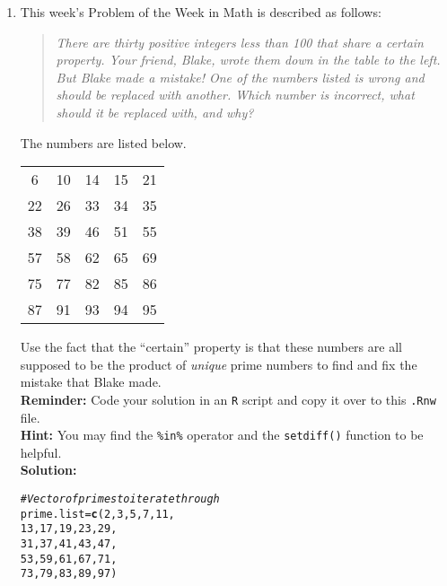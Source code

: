 \documentclass{article}\usepackage[]{graphicx}\usepackage[]{xcolor}
\makeatletter
\newcommand{\hlnum}[1]{\textcolor[rgb]{0.686,0.059,0.569}{#1}}%
\newcommand{\hlcom}[1]{\textcolor[rgb]{0.678,0.584,0.686}{\textit{#1}}}%
\newcommand{\hldef}[1]{\textcolor[rgb]{0.345,0.345,0.345}{#1}}%
\newcommand{\hlkwb}[1]{\textcolor[rgb]{0.69,0.353,0.396}{#1}}%
\newcommand{\hlkwd}[1]{\textcolor[rgb]{0.737,0.353,0.396}{\textbf{#1}}}%
\newenvironment{kframe}{%
 \def\at@end@of@kframe{}%
 \ifinner\ifhmode%
  \def\at@end@of@kframe{\end{minipage}}%
  \begin{minipage}{\columnwidth}%
 \fi\fi%
 \def\FrameCommand##1{\hskip\@totalleftmargin \hskip-\fboxsep
 \colorbox{shadecolor}{##1}\hskip-\fboxsep
     \hskip-\linewidth \hskip-\@totalleftmargin \hskip\columnwidth}%
 \MakeFramed {\advance\hsize-\width
   \@totalleftmargin\z@ \linewidth\hsize
   \@setminipage}}%
 {\par\unskip\endMakeFramed%
 \at@end@of@kframe}
\newenvironment{knitrout}{}{} %
\makeatother
\begin{document}
\begin{enumerate}
\item This week's Problem of the Week in Math is described as follows:
\begin{quotation}
  \textit{There are thirty positive integers less than 100 that share a certain 
  property. Your friend, Blake, wrote them down in the table to the left. But 
  Blake made a mistake! One of the numbers listed is wrong and should be replaced 
  with another. Which number is incorrect, what should it be replaced with, and 
  why?}
\end{quotation}
The numbers are listed below.
\begin{center}
  \begin{tabular}{ccccc}
    6 & 10 & 14 & 15 & 21\\
    22 & 26 & 33 & 34 & 35\\
    38 & 39 & 46 & 51 & 55\\
    57 & 58 & 62 & 65 & 69\\
    75 & 77 & 82 & 85 & 86\\
    87 & 91 & 93 & 94 & 95
  \end{tabular}
\end{center}
Use the fact that the ``certain'' property is that these numbers are all supposed
to be the product of \emph{unique} prime numbers to find and fix the mistake that
Blake made.\\
\textbf{Reminder:} Code your solution in an \texttt{R} script and copy it over
to this \texttt{.Rnw} file.\\
\textbf{Hint:} You may find the \verb|%in%| operator and the \verb|setdiff()| function to be helpful.\\

\textbf{Solution:} 

\begin{knitrout}\scriptsize
{}\color{fgcolor}\begin{kframe}
\begin{alltt}
\hlcom{#Vector of primes to iterate through}
\hldef{prime.list} \hlkwb{=} \hlkwd{c}\hldef{(}\hlnum{2}\hldef{,} \hlnum{3}\hldef{,} \hlnum{5}\hldef{,} \hlnum{7}\hldef{,} \hlnum{11}\hldef{,}
               \hlnum{13}\hldef{,} \hlnum{17}\hldef{,} \hlnum{19}\hldef{,} \hlnum{23}\hldef{,} \hlnum{29}\hldef{,}
               \hlnum{31}\hldef{,} \hlnum{37}\hldef{,} \hlnum{41}\hldef{,} \hlnum{43}\hldef{,} \hlnum{47}\hldef{,}
               \hlnum{53}\hldef{,} \hlnum{59}\hldef{,} \hlnum{61}\hldef{,} \hlnum{67}\hldef{,} \hlnum{71}\hldef{,}
               \hlnum{73}\hldef{,} \hlnum{79}\hldef{,} \hlnum{83}\hldef{,} \hlnum{89}\hldef{,} \hlnum{97}\hldef{)}


\end{alltt}
\end{kframe}
\end{knitrout}
\end{enumerate}
\end{document}
